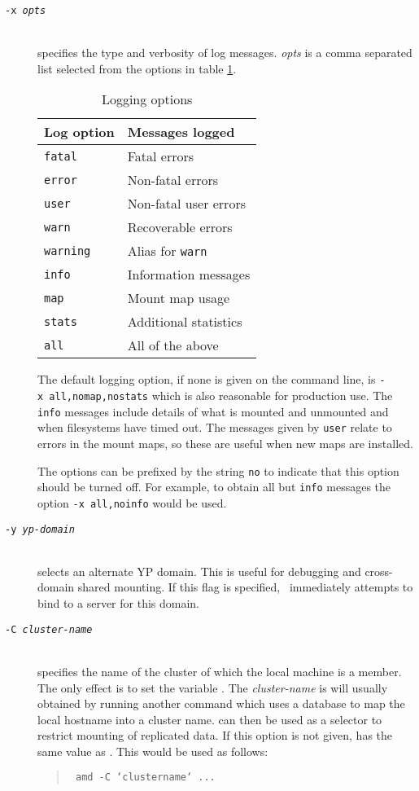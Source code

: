 \begin{description}
\item[\tt -x \em opts]\mbox{}\\
specifies the type and verbosity of log messages.  {\em opts} is
a comma separated list selected from the options in table \ref{table:x opts}.
\begin{table}[htb]
\centering
\begin{tabular}{ll}
Log option  & Messages logged \\\hline
\tt fatal   & Fatal errors \\
\tt error   & Non-fatal errors \\
\tt user    & Non-fatal user errors \\
\tt warn    & Recoverable errors \\
\tt warning & Alias for \tt warn \\
\tt info    & Information messages \\
\tt map     & Mount map usage \\
\tt stats   & Additional statistics \\
\tt all     & All of the above \\
\end{tabular}
\caption{Logging options\label{table:x opts}}
\end{table}
The default logging option, if none is given on the command line,
is {\tt -x~all,nomap,nostats} which is also reasonable for production use.
The {\tt info} messages
include details of what is mounted and unmounted and when filesystems
have timed out.  The messages given by {\tt user} relate to errors
in the mount maps, so these are useful when new maps are installed.

The options can be prefixed by the string {\tt no} to indicate
that this option should be turned off.  For example, to obtain all
but {\tt info} messages the option {\tt -x~all,noinfo} would be used.

\item[\tt -y \em yp-domain]\mbox{}\\
selects an alternate YP domain.  This is useful for debugging and
cross-domain shared mounting.
If this flag is specified, \amd\ immediately attempts to
bind to a server for this domain.

\item[\tt -C \em cluster-name]\mbox{}\\
specifies the name of the cluster of which the local machine is a member.
The only effect is to set the variable .
The {\em cluster-name} is will usually obtained by running another command which uses
a database to map the local hostname into a cluster name.
 can then be used as a selector to restrict mounting of
replicated data.
If this option is not given,  has the same value as .
This would be used as follows:
\begin{quote}
\tt
amd -C `clustername` ...
\end{quote}


\end{description}
